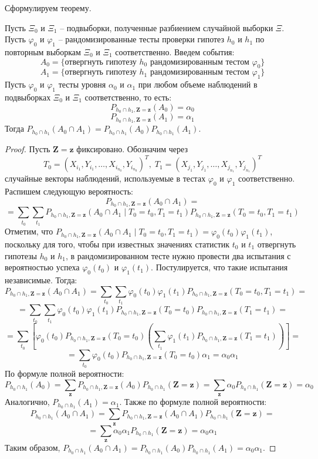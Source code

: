 Сформулируем теорему.
\begin{theorem}\label{main_theorem}
    Пусть $\Xi_0$ и $\Xi_1$ -- подвыборки, полученные разбиением случайной выборки $\Xi$.
    Пусть $\varphi_0$ и $\varphi_1$ -- рандомизированные тесты 
    проверки гипотез $h_0$ и $h_1$ по повторным выборкам 
    $\Xi_0$ и $\Xi_1$ соответственно.
    Введем события:
    $$A_0 = \{\text{отвергнуть гипотезу $h_0$ рандомизированным тестом $\varphi_0$}\}$$ 
    $$A_1 = \{\text{отвергнуть гипотезу $h_1$ рандомизированным тестом $\varphi_1$}\}$$
    Пусть $\varphi_0$ и $\varphi_1$ тесты уровня $\alpha_0$ и $\alpha_1$
    при любом объеме наблюдений в подвыборках $\Xi_0$ и $\Xi_1$ соответственно, то есть:
    $$P_{h_0\cap h_1,\mathbf{Z=z}}(A_0)=\alpha_0$$ 
    $$P_{h_0\cap h_1,\mathbf{Z=z}}(A_1)=\alpha_1$$
    Тогда $P_{h_0\cap h_1}(A_0 \cap A_1)= P_{h_0\cap h_1}(A_0) P_{h_0\cap h_1}(A_1)$.
\end{theorem}
\begin{proof}
    Пусть $\mathbf{Z}=\mathbf{z}$ фиксировано. 
    Обозначим через
    $$T_0=(X_{i_1},Y_{i_1},\ldots,X_{i_{n_0}},Y_{i_{n_0}})^T, \;
    T_1=(X_{j_1},Y_{j_1},\ldots,X_{j_{n_1}},Y_{j_{n_1}})^T$$
    случайные векторы наблюдений, используемые в тестах $\varphi_0$ и 
    $\varphi_1$ соответственно.
    Распишем следующую вероятность:
    $$
    P_{h_0\cap h_1,\mathbf{Z=z}}(A_0 \cap A_1)=
    $$
    $$
    =\sum_{t_0}\sum_{t_1} P_{h_0\cap h_1,\mathbf{Z=z}}(A_0 \cap A_1 \mid T_0=t_0, T_1=t_1)P_{h_0\cap h_1,\mathbf{Z=z}}(T_0=t_0, T_1=t_1)
    $$
    Отметим, что $P_{h_0\cap h_1,\mathbf{Z=z}}(A_0 \cap A_1 \mid T_0=t_0, T_1=t_1)=\varphi_0(t_0)\varphi_1(t_1)$, поскольку
    для того, чтобы при известных значениях статистик $t_0$ и $t_1$ отвергнуть гипотезы $h_0$ и $h_1$, в рандомизированном тесте нужно провести два испытания с вероятностью успеха
    $\varphi_0(t_0)$ и $\varphi_1(t_1)$. Постулируется, что такие испытания независимые. Тогда:
    $$
    P_{h_0\cap h_1,\mathbf{Z=z}}(A_0 \cap A_1)=\sum_{t_0}\sum_{t_1} \varphi_0(t_0) \varphi_1(t_1) P_{h_0\cap h_1,\mathbf{Z=z}}(T_0=t_0, T_1=t_1)=
    $$
    $$
    =\sum_{t_0}\sum_{t_1} \varphi_0(t_0) \varphi_1(t_1) P_{h_0\cap h_1,\mathbf{Z=z}}(T_0=t_0)P_{h_0\cap h_1,\mathbf{Z=z}}(T_1=t_1)=
    $$
    $$
    =\sum_{t_0}\left[ \varphi_0(t_0) P_{h_0\cap h_1,\mathbf{Z=z}}(T_0=t_0) \left(\sum_{t_1}\varphi_1(t_1) P_{h_0\cap h_1,\mathbf{Z=z}}(T_1=t_1)\right)\right]=
    $$
    $$
    = \sum_{t_0} \varphi_0(t_0) P_{h_0\cap h_1,\mathbf{Z=z}}(T_0=t_0) \alpha_1 
    =\alpha_0 \alpha_1
    $$
    По формуле полной вероятности:
    $$
    P_{h_0\cap h_1}(A_0) = \sum_{\mathbf{z}} P_{h_0\cap h_1,\mathbf{Z=z}}(A_0) P_{h_0\cap h_1}(\mathbf{Z}=\mathbf{z})
    = \sum_{\mathbf{z}} \alpha_0 P_{h_0\cap h_1}(\mathbf{Z}=\mathbf{z})=\alpha_0
    $$
    Аналогично, $P_{h_0\cap h_1}(A_1)=\alpha_1$. Также по формуле полной вероятности:
    $$
    P_{h_0\cap h_1}(A_0 \cap A_1) = \sum_{\mathbf{z}} P_{h_0\cap h_1,\mathbf{Z=z}}(A_0 \cap A_1) P_{h_0\cap h_1}(\mathbf{Z}=\mathbf{z})=
    $$
    $$
    = \sum_{\mathbf{z}} \alpha_0 \alpha_1 P_{h_0\cap h_1}(\mathbf{Z}=\mathbf{z})
    = \alpha_0 \alpha_1
    $$
    Таким образом, $P_{h_0\cap h_1}(A_0 \cap A_1)=P_{h_0\cap h_1}(A_0) P_{h_0\cap h_1}(A_1)=\alpha_0 \alpha_1$.
\end{proof}
